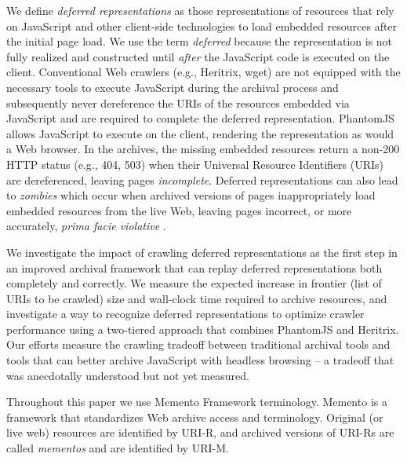 \documentclass{ipres_proc_article-sp}
\begin{document}
We define \emph{deferred representations} as those representations of resources that rely on JavaScript and other client-side technologies to load embedded resources after the initial page load. We use the term \emph{deferred} because the representation is not fully realized and constructed until \emph{after} the JavaScript code is executed on the client. 
Conventional Web crawlers (e.g., Heritrix, wget) are not equipped with the necessary tools to execute JavaScript during the archival process \cite{googleJS} and subsequently never dereference the URIs of the resources embedded via JavaScript and are required to complete the deferred representation. PhantomJS allows JavaScript to execute on the client, rendering the representation as would a Web browser. In the archives, the missing embedded resources return a non-200 HTTP status (e.g., 404, 503) when their Universal Resource Identifiers (URIs) are dereferenced, leaving pages \emph{incomplete}. Deferred representations can also lead to \emph{zombies} which occur when archived versions of pages inappropriately load embedded resources from the live Web, leaving pages incorrect, or more accurately, \emph{prima facie violative} \cite{ainsworthTR}. 

We investigate the impact of crawling deferred representations as the first step in an improved archival framework that can replay deferred representations both completely and correctly. We measure the expected increase in frontier (list of URIs to be crawled) size and wall-clock time required to archive resources, and investigate a way to recognize deferred representations to optimize crawler performance using a two-tiered approach that combines PhantomJS and Heritrix. Our efforts measure the crawling tradeoff between traditional archival tools and tools that can better archive JavaScript with headless browsing -- a tradeoff that was anecdotally understood but not yet measured.

Throughout this paper we use Memento Framework terminology. Memento \cite{nelson:memento:tr} is a framework that standardizes Web archive access and terminology. Original (or live web) resources are identified by URI-R, and archived versions of URI-Rs are called \emph{mementos} and are identified by URI-M. 
\end{document}
